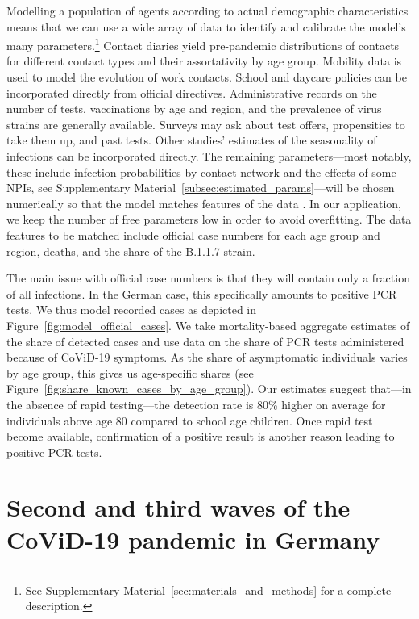 Modelling a population of agents according to actual demographic characteristics means
that we can use a wide array of data to identify and calibrate the model's many
parameters.\footnote{See Supplementary Material~\ref{sec:materials_and_methods} for a
    complete description.} Contact diaries yield pre-pandemic distributions of contacts for
different contact types and their assortativity by age group. Mobility data is used to
model the evolution of work contacts. School and daycare policies can be incorporated
directly from official directives. Administrative records on the number of tests,
vaccinations by age and region, and the prevalence of virus strains are generally
available. Surveys may ask about test offers, propensities to take them up, and past
tests. Other studies' estimates of the seasonality of infections can be incorporated
directly. The remaining parameters---most notably, these include infection probabilities
by contact network and the effects of some NPIs, see Supplementary
Material~\ref{subsec:estimated_params}---will be chosen numerically so that the model
matches features of the data \citep[see][for the general method]{McFadden1989}. In our
application, we keep the number of free parameters low in order to avoid overfitting.
The data features to be matched include official case numbers for each age group and
region, deaths, and the share of the B.1.1.7 strain.

The main issue with official case numbers is that they will contain only a fraction of
all infections. In the German case, this specifically amounts to positive PCR tests. We
thus model recorded cases as depicted in Figure~\ref{fig:model_official_cases}. We take
mortality-based aggregate estimates of the share of detected cases and use data on the
share of PCR tests administered because of CoViD-19 symptoms. As the share of
asymptomatic individuals varies by age group, this gives us age-specific shares (see
Figure~\ref{fig:share_known_cases_by_age_group}). Our estimates suggest that---in the
absence of rapid testing---the detection rate is 80\% higher on average for individuals
above age 80 compared to school age children. Once rapid test become available,
confirmation of a positive result is another reason leading to positive PCR tests.

\section*{Second and third waves of the CoViD-19 pandemic in Germany}

